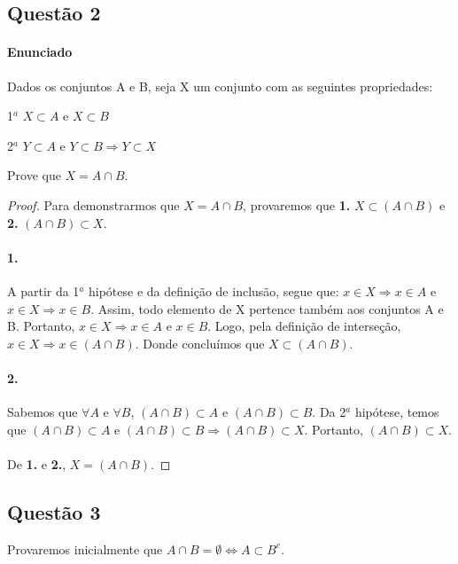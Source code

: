 \documentclass[9pt,twocolumn,a4paper]{article}
\begin{document}
    \subsection{Questão 2}
    \paragraph{Enunciado}
    Dados os conjuntos A e B, seja X um conjunto com as seguintes propriedades:

    1$^{a}$ $X \subset A$ e $X \subset B$

    2$^{a}$ $Y \subset A$ e $Y \subset B \Rightarrow Y \subset X$
    
    Prove que $X = A \cap B$.
    \begin{proof}
    Para demonstrarmos que $X = A \cap B$, provaremos que \textbf{1.} $X \subset (A \cap B)$ e \textbf{2.} $(A \cap B) \subset X$.

    \paragraph{1.}
    A partir da 1$^a$ hipótese e da definição de inclusão, segue que: $x \in X \Rightarrow x \in A$ e $x \in X \Rightarrow x \in B$. Assim, todo elemento de X pertence também aos conjuntos A e B. Portanto, $x \in X \Rightarrow x \in A$ e $x \in B$. Logo, pela definição de interseção, $x \in X \Rightarrow x \in (A\cap B)$. Donde concluímos que $X \subset (A \cap B)$.

    \paragraph{2.}
    Sabemos que $\forall A$ e $\forall B$, $(A \cap B) \subset A$ e $(A \cap B) \subset B$. Da 2$^{a}$ hipótese, temos que $(A \cap B) \subset A$ e $(A \cap B) \subset B \Rightarrow (A \cap B) \subset X$. Portanto, $(A \cap B) \subset X$.

    \paragraph{}
    De \textbf{1.} e \textbf{2.}, $X = (A \cap B)$.
    \end{proof}


    \subsection{Questão 3}
    Provaremos inicialmente que $A \cap B = \emptyset \Leftrightarrow A \subset B^c$.
\end{document}

